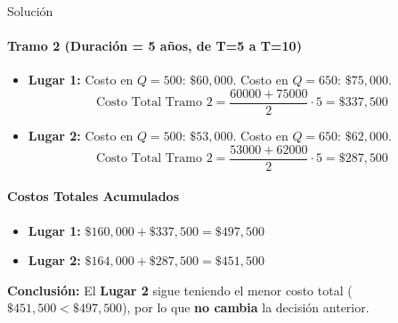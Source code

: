 \documentclass[11pt, a4paper]{article}
\begin{document}
\begin{ejercicio}{Solución}
  \paragraph{Tramo 2 (Duración = 5 años, de T=5 a T=10)}
  \begin{itemize}
    \item \textbf{Lugar 1:}
      Costo en $Q=500$: $\$60,000$. Costo en $Q=650$: $\$75,000$.
      \begin{equation*}
        \text{Costo Total Tramo 2} = \frac{60000 + 75000}{2} \cdot 5 = \$337,500
      \end{equation*}
    \item \textbf{Lugar 2:}
      Costo en $Q=500$: $\$53,000$. Costo en $Q=650$: $\$62,000$.
      \begin{equation*}
        \text{Costo Total Tramo 2} = \frac{53000 + 62000}{2} \cdot 5 = \$287,500
      \end{equation*}
  \end{itemize}

  \paragraph{Costos Totales Acumulados}
  \begin{itemize}
    \item \textbf{Lugar 1:} $\$160,000 + \$337,500 = \$497,500$
    \item \textbf{Lugar 2:} $\$164,000 + \$287,500 = \$451,500$
  \end{itemize}

  \textbf{Conclusión:} El \textbf{Lugar 2} sigue teniendo el menor costo total ($\$451,500 < \$497,500$), por lo que \textbf{no cambia} la decisión anterior.

\end{ejercicio}

\newpage
\end{document}
